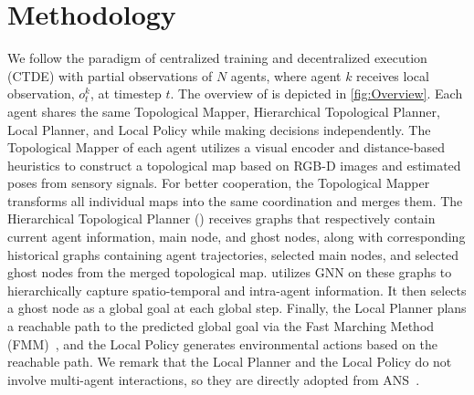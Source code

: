 
\section{Methodology}
We follow the paradigm of centralized training and decentralized execution (CTDE) with partial observations of $N$ agents, where agent $k$ receives local observation, $o_{t}^k$, at timestep $t$. The overview of {\name} is depicted in \cref{fig:Overview}. Each agent shares the same Topological Mapper, Hierarchical Topological Planner, Local Planner, and Local Policy while making decisions independently. The Topological Mapper of each agent utilizes a visual encoder and distance-based heuristics to construct a topological map based on RGB-D images and estimated poses from sensory signals. For better cooperation, the Topological Mapper transforms all individual maps into the same coordination and merges them. The Hierarchical Topological Planner (\planner) receives graphs that respectively contain current agent information, main node, and ghost nodes, along with corresponding historical graphs containing agent trajectories, selected main nodes, and selected ghost nodes from the merged topological map.
{\planner} utilizes GNN on these graphs to hierarchically capture spatio-temporal and intra-agent information. It then selects a ghost node as a global goal at each global step.
Finally, the Local Planner plans a reachable path to the predicted global goal via the Fast Marching Method (FMM)~\cite{fmm}, and the Local Policy generates environmental actions based on the reachable path. We remark that the Local Planner and the Local Policy do not involve multi-agent interactions, so they are directly adopted from ANS~\cite{ans}.








